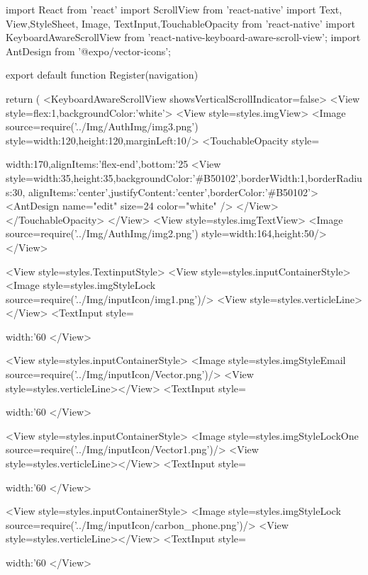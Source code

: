 import React from 'react'
import { ScrollView } from 'react-native'
import { Text, View,StyleSheet, Image, TextInput,TouchableOpacity } from 'react-native'
import {KeyboardAwareScrollView} from 'react-native-keyboard-aware-scroll-view';
import { AntDesign } from '@expo/vector-icons';

export default function Register({navigation}) {
  return (
    <KeyboardAwareScrollView showsVerticalScrollIndicator={false}>
   <View style={{flex:1,backgroundColor:'white'}}>
      <View style={styles.imgView}>
        <Image source={require('../Img/AuthImg/img3.png')} style={{width:120,height:120,marginLeft:10}}/>
        <TouchableOpacity style={{width:170,alignItems:'flex-end',bottom:'25%
          <View style={{width:35,height:35,backgroundColor:'#B50102',borderWidth:1,borderRadius:30,
        alignItems:'center',justifyContent:'center',borderColor:'#B50102'}}>
        <AntDesign name="edit" size={24} color="white" />
        </View>
        </TouchableOpacity>
      </View>
      <View style={styles.imgTextView}>
      <Image source={require('../Img/AuthImg/img2.png')} style={{width:164,height:50}}/>
      </View>

      <View style={styles.TextinputStyle}>
         <View style={styles.inputContainerStyle}>
            <Image style={styles.imgStyleLock} source={require('../Img/inputIcon/img1.png')}/>
            <View style={styles.verticleLine}></View>
            <TextInput style={{width:'60%
         </View>

         <View style={styles.inputContainerStyle}>
            <Image style={styles.imgStyleEmail} source={require('../Img/inputIcon/Vector.png')}/>
            <View style={styles.verticleLine}></View>
            <TextInput style={{width:'60%
         </View>

         <View style={styles.inputContainerStyle}>
            <Image style={styles.imgStyleLockOne} source={require('../Img/inputIcon/Vector1.png')}/>
            <View style={styles.verticleLine}></View>
            <TextInput style={{width:'60%
         </View>

         <View style={styles.inputContainerStyle}>
            <Image style={styles.imgStyleLock} source={require('../Img/inputIcon/carbon_phone.png')}/>
            <View style={styles.verticleLine}></View>
            <TextInput style={{width:'60%
         </View>

}}}}}}}}}}}
